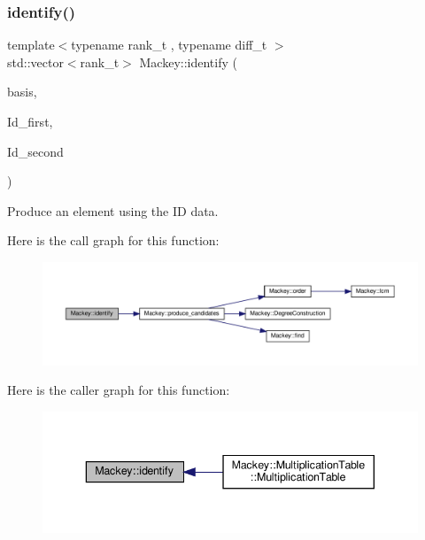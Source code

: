 \subsubsection{\texorpdfstring{identify()}{identify()}\hspace{0.1cm}{\footnotesize\ttfamily [1/2]}}
{\footnotesize\ttfamily template$<$typename rank\+\_\+t , typename diff\+\_\+t $>$ \\
std\+::vector$<$rank\+\_\+t$>$ Mackey\+::identify (\begin{DoxyParamCaption}\item[{const rank\+\_\+t \&}]{basis,  }\item[{const \hyperlink{classMackey_1_1IDGenerators}{I\+D\+Generators}$<$ rank\+\_\+t, diff\+\_\+t $>$ \&}]{Id\+\_\+first,  }\item[{const \hyperlink{classMackey_1_1IDGenerators}{I\+D\+Generators}$<$ rank\+\_\+t, diff\+\_\+t $>$ \&}]{Id\+\_\+second }\end{DoxyParamCaption})}



Produce an element using the ID data. 

Here is the call graph for this function\+:\nopagebreak
\begin{figure}[H]
\begin{center}
\leavevmode
\includegraphics[width=350pt]{namespaceMackey_a3fa96ba9b7316a92eca2f5c0bd1cca4d_cgraph}
\end{center}
\end{figure}
Here is the caller graph for this function\+:\nopagebreak
\begin{figure}[H]
\begin{center}
\leavevmode
\includegraphics[width=343pt]{namespaceMackey_a3fa96ba9b7316a92eca2f5c0bd1cca4d_icgraph}
\end{center}
\end{figure}
\mbox{\label{namespaceMackey_aef8ef1f2b3e72e33d5c028a76d1577db}} 
